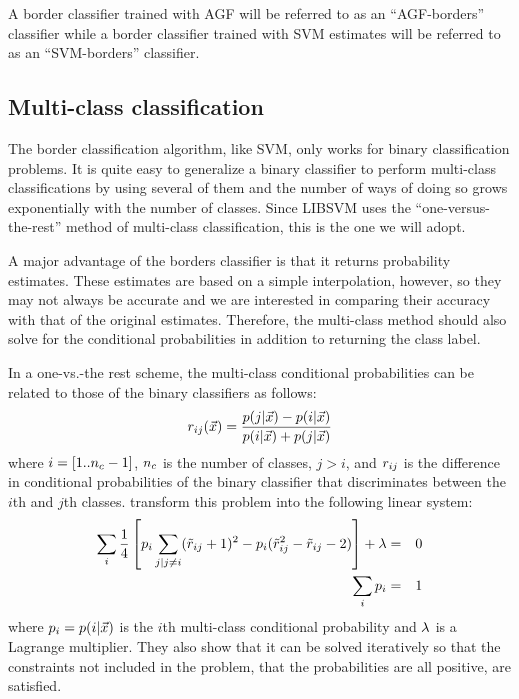 \documentclass[11pt]{article}
\begin{document}
A border classifier trained with AGF will be referred to as an ``AGF-borders''
classifier while a border classifier trained with SVM estimates will
be referred to as an ``SVM-borders'' classifier.

\subsection{Multi-class classification}

The border classification algorithm, like SVM, only works for binary 
classification problems. It is quite easy to generalize a binary classifier
to perform multi-class classifications by using several of them and the
number of ways of doing so grows exponentially with the number of classes.
Since LIBSVM uses the ``one-versus-the-rest'' method \citep{Hsu_Lin2002} of 
multi-class classification, this is the one we will adopt. 

A major advantage of the
borders classifier is that it returns probability estimates.
These estimates are based on a simple interpolation, however, so they may
not always be accurate and we are interested in comparing their accuracy
with that of the original estimates. Therefore, the multi-class method
should also solve for the conditional probabilities in addition to returning
the class label.

In a one-vs.-the rest scheme, the multi-class conditional probabilities 
can be related to those of the binary classifiers as follows:
\begin{equation}
	r_{ij}(\vec {x}) = \frac{p(j|\vec {x}) - p(i|\vec {x})}{p(i|\vec {x}) + p(j|\vec {x})}
\end{equation}
where $i=[1..n_c-1]$, $n_c$ is the number of classes, $j>i$,
and $r_{ij}$ is the difference in conditional probabilities of
the binary classifier that discriminates between the $i$th and $j$th classes.
\citet{Wu_etal2004} transform this problem into the following linear system:
\begin{eqnarray}
	\sum_i \frac{1}{4} \left [ p_i \sum_{j|j \ne i} (\tilde r_{ij} + 1)^2 - p_i (\tilde r_{ij}^2 - \tilde r_{ij} - 2) \right ] + \lambda & = & 0 \\
	\sum_i p_i & = & 1
\end{eqnarray}
where $p_i = p(i | \vec {x})$ is the $i$th multi-class 
conditional probability and $\lambda$ is a Lagrange multiplier.
They also show that it can be solved iteratively so that the constraints 
not included in the problem, that the probabilities are all positive, are satisfied.
\end{document}
